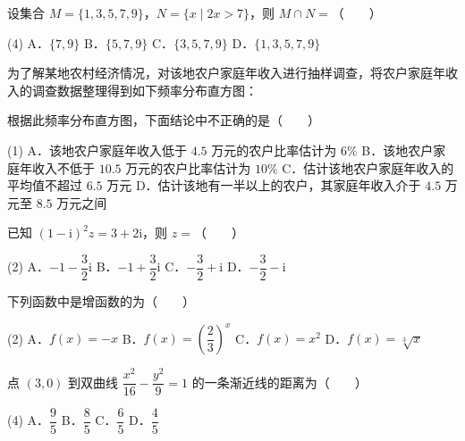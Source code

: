 \begin{question}
设集合 $M=\{1,3,5,7,9\}$，$N=\{x\mid 2x>7\}$，则 $M\cap N=$\mbox{（　　）}

\begin{gkopts}(4)
\task A．$\{7,9\}$
\task B．$\{5,7,9\}$
\task C．$\{3,5,7,9\}$
\task D．$\{1,3,5,7,9\}$
\end{gkopts}

\Needspace{0.4\textheight}
\end{question}
\begin{question}
为了解某地农村经济情况，对该地农户家庭年收入进行抽样调查，将农户家庭年收入的调查数据整理得到如下频率分布直方图：
\nopagebreak[4]
\begin{center}\end{center}
\nopagebreak[4]
根据此频率分布直方图，下面结论中不正确的是\mbox{（　　）}

\begin{gkopts}(1)
\task A．该地农户家庭年收入低于 $4.5$ 万元的农户比率估计为 $6\%$
\task B．该地农户家庭年收入不低于 $10.5$ 万元的农户比率估计为 $10\%$
\task C．估计该地农户家庭年收入的平均值不超过 $6.5$ 万元
\task D．估计该地有一半以上的农户，其家庭年收入介于 $4.5$ 万元至 $8.5$ 万元之间
\end{gkopts}

\end{question}
\begin{question}
已知 $(1-\mathrm i)^{2}z=3+2\mathrm i$，则 $z=$\mbox{（　　）}

\begin{gkopts}(2)
\task A．$-1-\dfrac32\mathrm i$
\task B．$-1+\dfrac32\mathrm i$
\task C．$-\dfrac32+\mathrm i$
\task D．$-\dfrac32-\mathrm i$
\end{gkopts}

\end{question}
\begin{question}
下列函数中是增函数的为\mbox{（　　）}

\begin{gkopts}(2)
\task A．$f(x)=-x$
\task B．$f(x)=\left(\dfrac23\right)^{x}$
\task C．$f(x)=x^{2}$
\task D．$f(x)=\sqrt[3]{x}$
\end{gkopts}

\end{question}
\begin{question}
点 $(3,0)$ 到双曲线 $\dfrac{x^{2}}{16}-\dfrac{y^{2}}9=1$ 的一条渐近线的距离为\mbox{（　　）}

\begin{gkopts}(4)
\task A．$\dfrac95$
\task B．$\dfrac85$
\task C．$\dfrac65$
\task D．$\dfrac45$
\end{gkopts}

\end{question}
